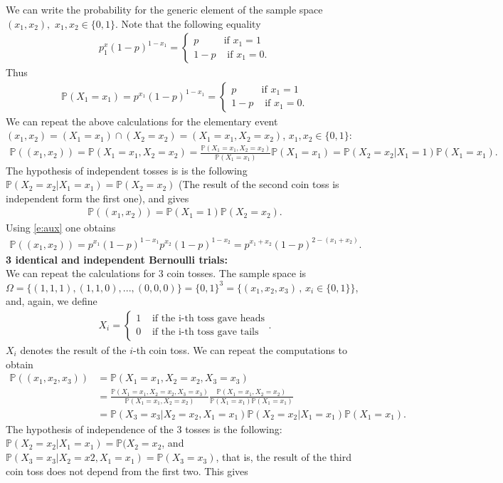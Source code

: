 \documentclass[12pt]{article}
\newcommand{\<}{{\langle \!\! \langle}}
\renewcommand{\>}{{\rangle \!\! \rangle}}
\newcommand{\bel}[2]{\begin{equation} \label{#1} \begin{split} #2
 					\end{split} \end{equation}}
\begin{document}
We can write the probability for the generic element of the sample space $(x_1,x_2),$ $x_1,x_2\in\{0,1\}$. Note that the following equality 
\bel{}{p^x_1(1-p)^{1-x_1}=\begin{cases}
p & \textrm{if } x_1=1\\
1-p & \textrm{ if } x_1=0.
\end{cases}}
Thus 
\bel{e:aux}{\mathbb{P}(X_1=x_1)=p^{x_1}(1-p)^{1-x_1}=\begin{cases}
p & \textrm{if } x_1=1\\
1-p & \textrm{ if } x_1=0.
\end{cases}}
 We can repeat the above calculations for the elementary event $(x_1,x_2)=(X_1=x_1)\cap(X_2=x_2)=(X_1=x_1,X_2=x_2)$, $x_1,x_2\in\{0,1\}$: 
\bel{}{\mathbb{P}((x_1,x_2))=\mathbb{P}(X_1=x_1,X_2=x_2)=\frac{\mathbb{P}(X_1=x_1,X_2=x_2)}{\mathbb{P}(X_1=x_1)}\mathbb{P}(X_1=x_1)=\mathbb{P}(X_2=x_2|X_1=1)\mathbb{P}(X_1=x_1).}
The hypothesis of independent tosses is is the following $\mathbb{P}(X_2=x_2|X_1=x_1)=\mathbb{P}(X_2=x_2)$ (The result of the second coin toss is independent form the first one), and gives 
\bel{}{
\mathbb{P}((x_1,x_2))=\mathbb{P}(X_1=1)\mathbb{P}(X_2=x_2).}
Using \eqref{e:aux} one obtains 
\bel{}{\mathbb{P}((x_1,x_2))=p^{x_1}(1-p)^{1-x_1}p^{x_2}(1-p)^{1-x_2}=p^{x_1+x_2}(1-p)^{2-(x_1+x_2)}.}
\textbf{3 identical and independent Bernoulli trials:}\\
We can repeat the calculations for 3 coin tosses. The sample space is $\Omega=\{(1,1,1),(1,1,0),...,(0,0,0)\}=\{0,1\}^3=\{(x_1,x_2,x_3)\,,\,x_i\in\{0,1\}\}$, and, again, we define
\bel{}{X_i=\begin{cases}
1 & \textrm{ if the i-th toss gave heads}\\
0 & \textrm{ if the i-th toss gave tails}
\end{cases}.}
$X_i$ denotes the result of the $i$-th coin toss. We can repeat the computations to obtain
\bel{}{\mathbb{P}((x_1,x_2,x_3)) &=\mathbb{P}(X_1=x_1,X_2=x_2,X_3=x_3) \\
& = \frac{\mathbb{P}(X_1=x_1,X_2=x_2,X_3=x_3)}{\mathbb{P}(X_1=x_1,X_2=x_2)}\frac{\mathbb{P}(X_1=x_1,X_2=x_2)}{\mathbb{P}(X_1=x_1)\mathbb{P}(X_1=x_1)} \\ & =\mathbb{P}(X_3=x_3|X_2=x_2,X_1=x_1)\mathbb{P}(X_2=x_2|X_1=x_1)\mathbb{P}(X_1=x_1).}
The hypothesis of independence of the 3 tosses is the following:
$\mathbb{P}(X_2=x_2|X_1=x_1)=\mathbb{P}(X_2=x_2$, and $\mathbb{P}(X_3=x_3|X_2=x2,X_1=x_1)=\mathbb{P}(X_3=x_3)$, that is, the result of the third coin toss does not depend from the first two. This gives 
\end{document}
